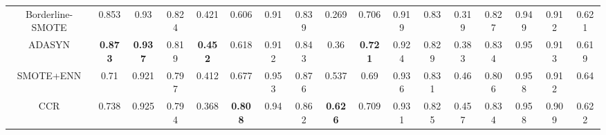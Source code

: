 \documentclass[runningheads]{llncs}
\begin{document}
\begin{table}[htbp]
{\begin{tabular}{@{}ccccccccccccccccc@{}}
      Borderline-SMOTE                                & 0.853                            & 0.93                                         & 0.824                      & 0.421                         & 0.606                            & 0.91                                         & 0.839                      & 0.269                         & 0.706                            & 0.919                                        & 0.83                       & 0.319                         & 0.827                            & 0.949                                        & 0.912                      & 0.621                         \\
      ADASYN                                          & \textbf{0.873}                   & \textbf{0.937}                               & 0.819                      & \textbf{0.452}                & 0.618                            & 0.912                                        & 0.843                      & 0.36                          & \textbf{0.721}                   & 0.924                                        & 0.829                      & 0.383                         & 0.834                            & 0.95                                         & 0.913                      & 0.619                         \\
      SMOTE+ENN                                       & 0.71                             & 0.921                                        & 0.797                      & 0.412                         & 0.677                            & 0.953                                        & 0.876                      & 0.537                         & 0.69                             & 0.936                                        & 0.831                      & 0.46                          & 0.806                            & 0.958                                        & 0.912                      & 0.64                          \\
      CCR                                             & 0.738                            & 0.925                                        & 0.794                      & 0.368                         & \textbf{0.808}                   & 0.94                                         & 0.862                      & \textbf{0.626}                & 0.709                            & 0.931                                        & 0.825                      & 0.457                         & 0.834                            & 0.958                                        & 0.909                      & 0.622                         \\

\end{tabular}}
\end{table}
\end{document}
